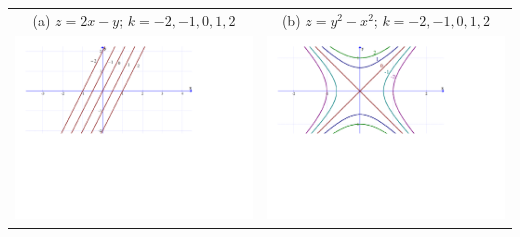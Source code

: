 \documentclass[12pt]{article}
\begin{document}
\begin{enumerate}
\begin{center}
\begin{tabular}{cc}
(a) $z=2x-y$; $k=-2,-1, 0, 1, 2$ & (b) $z=y^2-x^2$; $k=-2,-1, 0, 1, 2$\\
\includegraphics[scale=0.35]{level1.pdf} & \includegraphics[scale=0.35]{level2.pdf}
\end{tabular}
\end{center}


\end{enumerate}
\end{document}
